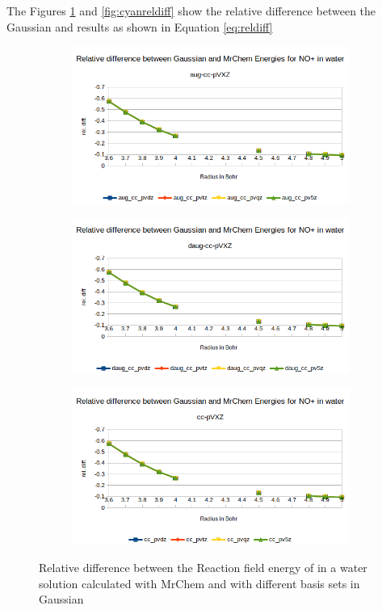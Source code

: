 \documentclass[../master_thesis.tex]{subfiles}
\begin{document}
The Figures \ref{fig:nopreldiff} and \ref{fig:cyanreldiff} show the relative
difference between the Gaussian and \mrchem results as shown in Equation \ref{eq:reldiff}


\begin{figure}[h!]
  \centering
  \begin{subfigure}[b]{0.75\linewidth}
    \includegraphics[width=\linewidth]{img/nopreldiff.png}
  \end{subfigure}
  \begin{subfigure}[b]{0.75\linewidth}
    \includegraphics[width=\linewidth]{img/nopaugreldiff.png}
  \end{subfigure}
  \begin{subfigure}[b]{0.75\linewidth}
    \includegraphics[width=\linewidth]{img/nopdaugreldiff.png}
  \end{subfigure}
  \caption{Relative difference between the Reaction field energy of  in a water solution calculated with MrChem
  and with different basis sets in Gaussian}
  \label{fig:nopreldiff}
\end{figure}
\end{document}
